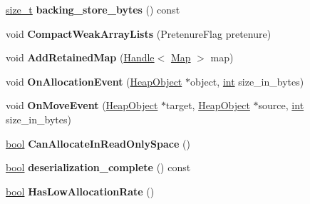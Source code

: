 \begin{DoxyCompactItemize}
\mbox{\hyperlink{classsize__t}{size\+\_\+t}} {\bfseries backing\+\_\+store\+\_\+bytes} () const
\item 
\mbox{\label{classv8_1_1internal_1_1Heap_a2629b8e8961bad7c05a6920bf876f42f}} 
void {\bfseries Compact\+Weak\+Array\+Lists} (Pretenure\+Flag pretenure)
\item 
\mbox{\label{classv8_1_1internal_1_1Heap_adf1811f300306185a8433c1781572ab0}} 
void {\bfseries Add\+Retained\+Map} (\mbox{\hyperlink{classv8_1_1internal_1_1Handle}{Handle}}$<$ \mbox{\hyperlink{classv8_1_1internal_1_1Map}{Map}} $>$ map)
\item 
\mbox{\label{classv8_1_1internal_1_1Heap_a544094daeb4e49f2be37c457e9f1a0b3}} 
void {\bfseries On\+Allocation\+Event} (\mbox{\hyperlink{classv8_1_1internal_1_1HeapObject}{Heap\+Object}} $\ast$object, \mbox{\hyperlink{classint}{int}} size\+\_\+in\+\_\+bytes)
\item 
\mbox{\label{classv8_1_1internal_1_1Heap_ac444266997bec9db737f316351eb9690}} 
void {\bfseries On\+Move\+Event} (\mbox{\hyperlink{classv8_1_1internal_1_1HeapObject}{Heap\+Object}} $\ast$target, \mbox{\hyperlink{classv8_1_1internal_1_1HeapObject}{Heap\+Object}} $\ast$source, \mbox{\hyperlink{classint}{int}} size\+\_\+in\+\_\+bytes)
\item 
\mbox{\label{classv8_1_1internal_1_1Heap_a15a31ece9ad488707fa27c181b82271e}} 
\mbox{\hyperlink{classbool}{bool}} {\bfseries Can\+Allocate\+In\+Read\+Only\+Space} ()
\item 
\mbox{\label{classv8_1_1internal_1_1Heap_afb9ec72d9172006e186179242edb3290}} 
\mbox{\hyperlink{classbool}{bool}} {\bfseries deserialization\+\_\+complete} () const
\item 
\mbox{\label{classv8_1_1internal_1_1Heap_aa7deecdcb6c6f8c6bc7c92c2f1693633}} 
\mbox{\hyperlink{classbool}{bool}} {\bfseries Has\+Low\+Allocation\+Rate} ()
\item 
\mbox{\label{classv8_1_1internal_1_1Heap_a8368bf50d73656c6df28dd1e80205049}} 

\end{DoxyCompactItemize}
